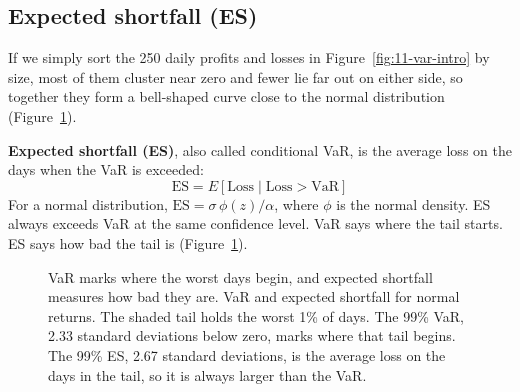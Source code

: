 \subsection{Expected shortfall (ES)}
If we simply sort the 250 daily profits and losses in Figure~\ref{fig:11-var-intro} by size, most of them cluster near zero and fewer lie far out on either side, so together they form a bell-shaped curve close to the normal distribution (Figure~\ref{fig:11-var-es}). 

\textbf{Expected shortfall (ES)}, also called conditional VaR, is the average loss on the days when the VaR is exceeded:
\begin{equation}
  \mathrm{ES} = E[\text{Loss} \mid \text{Loss} > \mathrm{VaR}]
  \label{eq:11-es}
\end{equation}
For a normal distribution, $\mathrm{ES} = \sigma\,\phi(z)/\alpha$, where $\phi$ is the normal density. ES always exceeds VaR at the same confidence level. VaR says where the tail starts. ES says how bad the tail is (Figure~\ref{fig:11-var-es}).

\begin{figure}[htbp]
\centering
{}
\caption{VaR marks where the worst days begin, and expected shortfall measures how bad they are. VaR and expected shortfall for normal returns. The shaded tail holds the worst 1\% of days. The 99\% VaR, 2.33 standard deviations below zero, marks where that tail begins. The 99\% ES, 2.67 standard deviations, is the average loss on the days in the tail, so it is always larger than the VaR.}
\label{fig:11-var-es}
\end{figure}


